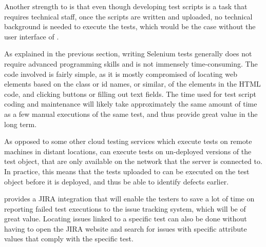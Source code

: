 Another strength to \toolname \space is that even though developing test scripts is a task that requires technical staff, once the scripts are written and uploaded, no technical background is needed to execute the tests, which would be the case without the user interface of \toolname.

As explained in the previous section, writing Selenium tests generally does not require advanced programming skills and is not immensely time-consuming. The code involved is fairly simple, as it is mostly compromised of locating web elements based on the class or id names, or similar, of the elements in the HTML code, and clicking buttons or filling out text fields. The time used for test script coding and maintenance will likely take approximately the same amount of time as a few manual executions of the same test, and thus provide great value in the long term.

As opposed to some other cloud testing services which execute tests on remote machines in distant locations, \toolname \space can execute tests on un-deployed versions of the test object, that are only available on the network that the \toolname \space server is connected to. In practice, this means that the tests uploaded to \toolname \space can be executed on the test object before it is deployed, and thus be able to identify defects earlier.

\toolname \space provides a JIRA integration that will enable the testers to save a lot of time on reporting failed test executions to the issue tracking system, which will be of great value. Locating issues linked to a specific test can also be done without having to open the JIRA website and search for issues with specific attribute values that comply with the specific test.











